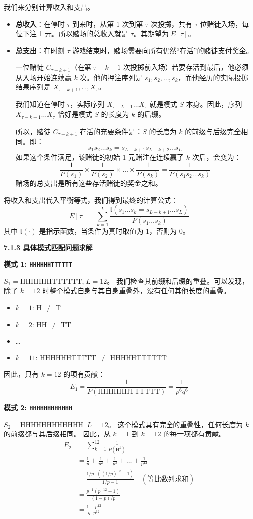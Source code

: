 \documentclass[UTF8]{ctexart}
\begin{document}
我们来分别计算收入和支出。
\begin{itemize}
    \item \textbf{总收入}：在停时 $\tau$ 到来时，从第 1 次到第 $\tau$ 次投掷，共有 $\tau$ 位赌徒入场，每位下注 1 元。所以赌场的总收入就是 $\tau$。其期望为 $E[\tau]$。
    \item \textbf{总支出}：在时刻 $\tau$ 游戏结束时，赌场需要向所有仍然“存活”的赌徒支付奖金。
    
    一位赌徒 $C_{\tau-k+1}$（在第 $\tau-k+1$ 次投掷前入场）若要存活到最后，他必须从入场开始连续赢 $k$ 次。他的押注序列是 $s_1, s_2, \dots, s_k$，而他经历的实际投掷结果序列是 $X_{\tau-k+1}, \dots, X_\tau$。
    
    我们知道在停时 $\tau$，实际序列 $X_{\tau-L+1} \dots X_\tau$ 就是模式 $S$ 本身。因此，序列 $X_{\tau-k+1} \dots X_\tau$ 恰好是模式 $S$ 的长度为 $k$ 的后缀。
    
    所以，赌徒 $C_{\tau-k+1}$ 存活的充要条件是：$S$ 的长度为 $k$ 的前缀与后缀完全相同。即：
    $$ s_1s_2\dots s_k = s_{L-k+1}s_{L-k+2}\dots s_L $$
    如果这个条件满足，该赌徒的初始 1 元赌注在连续赢了 $k$ 次后，会变为：
    $$ \frac{1}{P(s_1)} \times \frac{1}{P(s_2)} \times \dots \times \frac{1}{P(s_k)} = \frac{1}{P(s_1s_2\dots s_k)} $$
    赌场的总支出是所有这些存活赌徒的奖金之和。
\end{itemize}
将收入和支出代入平衡等式，我们得到最终的计算公式：
$$ E[\tau] = \sum_{k=1}^{L} \frac{\mathbb{I}(s_1\dots s_k = s_{L-k+1}\dots s_L)}{P(s_1\dots s_k)} $$
其中 $\mathbb{I}(\cdot)$ 是指示函数，当条件为真时取值为 1，否则为 0。

\textbf{7.1.3 具体模式匹配问题求解}

\textbf{模式 1: \texttt{HHHHHHTTTTTT}}

$S_1 = \text{HHHHHHTTTTTT}$, $L=12$。
我们检查其前缀和后缀的重叠。可以发现，除了 $k=12$ 时整个模式自身与其自身重叠外，没有任何其他长度的重叠。
\begin{itemize}
    \item $k=1$: H $\neq$ T
    \item $k=2$: HH $\neq$ TT
    \item \dots
    \item $k=11$: HHHHHHTTTTT $\neq$ HHHHHTTTTTT
\end{itemize}
因此，只有 $k=12$ 的项有贡献：
$$ E_1 = \frac{1}{P(\text{HHHHHHTTTTTT})} = \frac{1}{p^6q^6} $$

\textbf{模式 2: \texttt{HHHHHHHHHHHH}}

$S_2 = \text{HHHHHHHHHHHH}$, $L=12$。
这个模式具有完全的重叠性，任何长度为 $k$ 的前缀都与其后缀相同。
因此，从 $k=1$ 到 $k=12$ 的每一项都有贡献。
\begin{align*}
    E_2 &= \sum_{k=1}^{12} \frac{1}{P(\text{H}^k)} \\
        &= \frac{1}{p} + \frac{1}{p^2} + \frac{1}{p^3} + \dots + \frac{1}{p^{12}} \\
        &= \frac{1/p \cdot ((1/p)^{12} - 1)}{1/p - 1} \quad (\text{等比数列求和}) \\
        &= \frac{p^{-1}(p^{-12}-1)}{(1-p)/p} \\
        &= \frac{1-p^{12}}{q \cdot p^{12}}
\end{align*}
\end{document}
